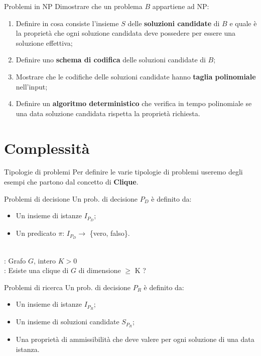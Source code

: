 \documentclass[10pt,a4paper]{article}
\begin{document}
\begin{multicols}{3}
\begin{textbox}{Problemi in NP}
Dimostrare che un problema \(B\) appartiene ad NP:
\begin{enumerate}[leftmargin=*]
    \item Definire in cosa consiste l'insieme \(S\) delle \textbf{soluzioni candidate} di \(B\) e quale è la proprietà che ogni soluzione candidata deve possedere per essere una soluzione effettiva;
    \item Definire uno \textbf{schema di codifica} delle soluzioni candidate di \(B\);
    \item Mostrare che le codifiche delle soluzioni candidate hanno \textbf{taglia polinomiale} nell'input;
    \item Definire un \textbf{algoritmo deterministico} che verifica in tempo polinomiale se una data soluzione candidata rispetta la proprietà richiesta.
\end{enumerate}
\end{textbox}




\section{Complessità}

\begin{textbox}{Tipologie di problemi}
Per definire le varie tipologie di problemi useremo degli esempi che
partono dal concetto di \textbf{Clique}.\\

\begin{textbox}{Problemi di decisione}
Un prob. di decisione \(P_D\) è definito da:
\begin{itemize}[leftmargin=*]
    \item Un insieme di istanze \(I_{P_D}\);
    \item Un predicato \(\pi\): \(I_{P_D} \rightarrow\) \{vero, falso\}.
\end{itemize}

\\
: Grafo \(G\), intero \(K > 0\) \\
: Esiste una clique di \(G\) di dimensione \(\geq\) K ?

\end{textbox}

\begin{textbox}{Problemi di ricerca}
Un prob. di decisione \(P_R\) è definito da:
\begin{itemize}[leftmargin=*]
    \item Un insieme di istanze \(I_{P_R}\);
    \item Un insieme di soluzioni candidate  \(S_{P_R}\);
    \item Una proprietà di ammissibilità che deve valere per ogni soluzione di una
    data istanza.
\end{itemize}


\end{textbox}
\end{textbox}
\end{multicols}
\end{document}
